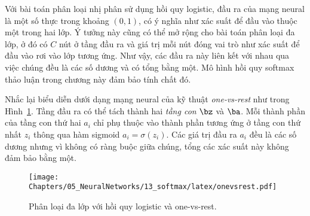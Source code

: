 Với bài toán phân loại nhị phân sử dụng hồi quy logistic, đầu ra của mạng neural
là một số thực trong khoảng $(0, 1)$, có ý nghĩa như xác suất để đầu vào thuộc
một trong hai lớp. Ý tưởng này cũng có thể mở rộng cho bài toán phân loại đa
lớp, ở đó có $C$ nút ở tầng đầu ra và giá trị mỗi nút đóng vai trò như xác
suất để đầu vào rơi vào lớp tương ứng. Như vậy, các đầu ra này liên kết với nhau
qua việc chúng đều là các số dương và có tổng bằng một. Mô hình hồi quy softmax
thảo luận trong chương này đảm bảo tính chất đó.

Nhắc lại biểu diễn dưới dạng mạng neural của kỹ thuật \textit{one-vs-rest} như
trong Hình~\ref{fig:13_1}. Tầng đầu ra có thể tách thành hai \textit{tầng con}
$\bz$ và $\ba$. Mỗi thành phần của tầng con thứ hai $a_i$ chỉ phụ thuộc vào
thành phần tương ứng ở tầng con thứ nhất $z_i$ thông qua hàm sigmoid $a_i =
\sigma(z_i)$. Các giá trị đầu ra $a_i$ đều là các số dương nhưng vì không có
ràng buộc giữa chúng, tổng các xác suất này không đảm bảo bằng một.




   
\begin{figure}[t]
\centering
    \texttt{[image: Chapters/05\_NeuralNetworks/13\_softmax/latex/onevsrest.pdf]}
    \caption[]{Phân loại đa lớp với hồi quy logistic và one-vs-rest.}
    \label{fig:13_1}
\end{figure}
 
